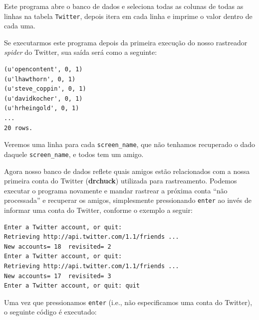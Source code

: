 Este programa abre o banco de dados e seleciona todas as colunas de todas as
linhas na tabela {\tt Twitter}, depois itera em cada linha e imprime o valor
dentro de cada uma.


Se executarmos este programa depois da primeira execução do nosso rastreador
{\it spider} do Twitter, sua saída será como a seguinte:

\beforeverb
\begin{verbatim}
(u'opencontent', 0, 1)
(u'lhawthorn', 0, 1)
(u'steve_coppin', 0, 1)
(u'davidkocher', 0, 1)
(u'hrheingold', 0, 1)
...
20 rows.
\end{verbatim}
\afterverb
%

Veremos uma linha para cada \verb"screen_name", que não tenhamos recuperado
o dado daquele \verb"screen_name", e todos tem um amigo.


Agora nosso banco de dados reflete quais amigos estão relacionados com a nossa
primeira conta do Twitter ({\bf drchuck}) utilizada para rastreamento. Podemos
executar o programa novamente e mandar rastrear a próxima conta
``não processada'' e recuperar os amigos, simplesmente pressionando {\tt enter}
ao invés de informar uma conta do Twitter, conforme o exemplo a seguir:

\beforeverb
\begin{verbatim}
Enter a Twitter account, or quit: 
Retrieving http://api.twitter.com/1.1/friends ...
New accounts= 18  revisited= 2
Enter a Twitter account, or quit: 
Retrieving http://api.twitter.com/1.1/friends ...
New accounts= 17  revisited= 3
Enter a Twitter account, or quit: quit
\end{verbatim}
\afterverb
%

%
Uma vez que pressionamos {\tt enter} (i.e., não especificamos uma conta do
Twitter), o seguinte código é executado:

